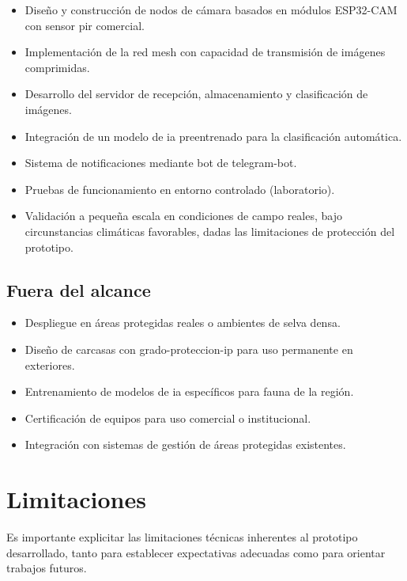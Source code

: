 \documentclass[a4paper, 12pt]{report}
\begin{document}
\begin{itemize}
  \item Diseño y construcción de nodos de cámara basados en módulos
    \gls{ESP32}-CAM con sensor \gls{pir} comercial.
  \item Implementación de la red \gls{mesh} con capacidad de transmisión de
    imágenes comprimidas.
  \item Desarrollo del servidor de recepción, almacenamiento y clasificación
    de imágenes.
  \item Integración de un modelo de \gls{ia} preentrenado para la
    clasificación automática.
  \item Sistema de notificaciones mediante bot de \gls{telegram-bot}.
  \item Pruebas de funcionamiento en entorno controlado (laboratorio).
  \item Validación a pequeña escala en condiciones de campo reales, bajo
    circunstancias climáticas favorables, dadas las limitaciones de
    protección del prototipo.
\end{itemize}

\subsection{Fuera del alcance}

\begin{itemize}
  \item Despliegue en áreas protegidas reales o ambientes de selva densa.
  \item Diseño de carcasas con \gls{grado-proteccion-ip} para uso permanente
    en exteriores.
  \item Entrenamiento de modelos de \gls{ia} específicos para fauna de la
    región.
  \item Certificación de equipos para uso comercial o institucional.
  \item Integración con sistemas de gestión de áreas protegidas existentes.
\end{itemize}

\section{Limitaciones}
\label{sec:limitaciones}

Es importante explicitar las limitaciones técnicas inherentes al prototipo
desarrollado, tanto para establecer expectativas adecuadas como para orientar
trabajos futuros.
\end{document}
